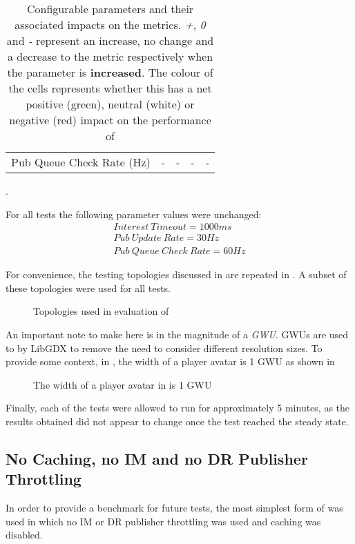 \begin{table}[H]
\begin{tabular}{@{}lcccc@{}}
    Pub Queue Check Rate (Hz)                      & \cellcolor[HTML]{FFCCC9}-        & \cellcolor[HTML]{FFCCC9}-        & \cellcolor[HTML]{FFCCC9}-               & \cellcolor[HTML]{9AFF99}-                  
    \end{tabular}
    \centering
    \caption{Configurable parameters and their associated impacts on the metrics. \textit{+}, \textit{0} and \textit{-} represent an increase, no change and a decrease to the metric respectively when the parameter is \textbf{increased}. The colour of the cells represents whether this has a net positive (green), neutral (white) or negative (red) impact on the performance of \game{}}.
    \label{tbl:eval:metric-matrix}
\end{table}

For all tests the following parameter values were unchanged:
\begin{gather*}
    Interest\ Timeout = 1000ms\\
    Pub\ Update\ Rate = 30Hz\\
    Pub\ Queue\ Check\ Rate = 60Hz
\end{gather*}

For convenience, the testing topologies discussed in  are repeated in . A subset of these topologies were used for all tests.
\begin{figure}[H]
    \centering
    \caption{Topologies used in evaluation of \game{}}
    \label{fig:eval:topologies}
\end{figure}

An important note to make here is in the magnitude of a \textit{GWU}. GWUs are used to by LibGDX to remove the need to consider different resolution sizes. To provide some context, in \game{}, the width of a player avatar is 1 GWU as shown in 

\begin{figure}[H]
    \centering
    \caption{The width of a player avatar in \game{} is 1 GWU}
    \label{fig:eval:gwus}
\end{figure}

Finally, each of the tests were allowed to run for approximately 5 minutes, as the results obtained did not appear to change once the test reached the steady state.

\subsection{No Caching, no IM and no DR Publisher Throttling}
In order to provide a benchmark for future tests, the most simplest form of \game{} was used in which no IM or DR publisher throttling was used and caching was disabled.

